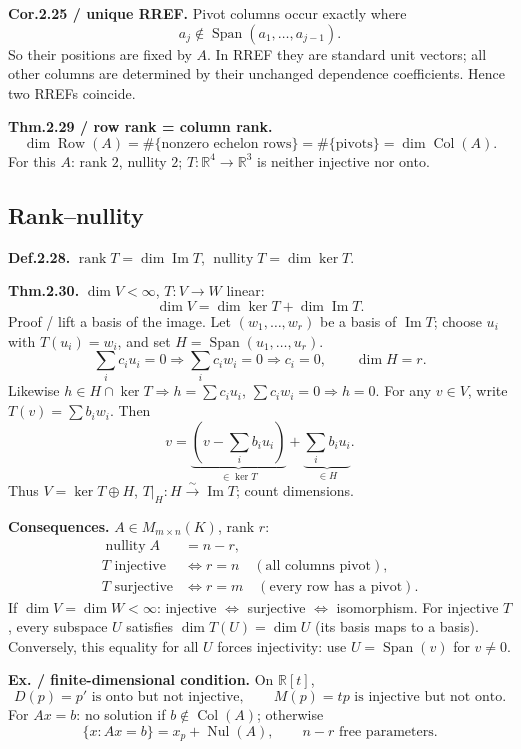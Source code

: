\documentclass[11pt,letterpaper]{article}
\begin{document}
\textbf{Cor.2.25 / unique RREF.} Pivot columns occur exactly where \[
a_j\notin\operatorname{Span}(a_1,\ldots,a_{j-1}).
\] So their positions are fixed by \(A\). In RREF they are standard unit
vectors; all other columns are determined by their unchanged dependence
coefficients. Hence two RREFs coincide.

\textbf{Thm.2.29 / row rank = column rank.} \[
\dim\operatorname{Row}(A)
=\#\{\text{nonzero echelon rows}\}
=\#\{\text{pivots}\}
=\dim\operatorname{Col}(A).
\] For this \(A\): rank \(2\), nullity \(2\);
\(T:\mathbb R^4\to\mathbb R^3\) is neither injective nor onto.

\newpage

\subsection{Rank--nullity}\label{ranknullity}

\textbf{Def.2.28.} \(\operatorname{rank}T=\dim\operatorname{Im}T\),
\(\operatorname{nullity}T=\dim\ker T\).

\textbf{Thm.2.30.} \(\dim V<\infty\), \(T:V\to W\) linear: \[
\boxed{\dim V=\dim\ker T+\dim\operatorname{Im}T.}
\] Proof / lift a basis of the image. Let \((w_1,\ldots,w_r)\) be a
basis of \(\operatorname{Im}T\); choose \(u_i\) with \(T(u_i)=w_i\), and
set \(H=\operatorname{Span}(u_1,\ldots,u_r)\). \[
\sum_i c_iu_i=0\Rightarrow\sum_i c_iw_i=0\Rightarrow c_i=0,
\qquad \dim H=r.
\] Likewise \(h\in H\cap\ker T\Rightarrow h=\sum c_iu_i\),
\(\sum c_iw_i=0\Rightarrow h=0\). For any \(v\in V\), write
\(T(v)=\sum b_iw_i\). Then \[
v=\underbrace{\left(v-\sum_i b_iu_i\right)}_{\in\ker T}
+\underbrace{\sum_i b_iu_i}_{\in H}.
\] Thus \(V=\ker T\oplus H\),
\(T|_H:H\xrightarrow{\sim}\operatorname{Im}T\); count dimensions.

\textbf{Consequences.} \(A\in M_{m\times n}(K)\), rank \(r\): \[
\begin{aligned}
\operatorname{nullity}A&=n-r,\\
T\text{ injective}&\iff r=n\quad(\text{all columns pivot}),\\
T\text{ surjective}&\iff r=m\quad(\text{every row has a pivot}).
\end{aligned}
\] If \(\dim V=\dim W<\infty\): injective \(\iff\) surjective \(\iff\)
isomorphism. For injective \(T\), every subspace \(U\) satisfies
\(\dim T(U)=\dim U\) (its basis maps to a basis). Conversely, this
equality for all \(U\) forces injectivity: use
\(U=\operatorname{Span}(v)\) for \(v\ne0\).

\textbf{Ex. / finite-dimensional condition.} On \(\mathbb R[t]\), \[
D(p)=p'\text{ is onto but not injective},\qquad
M(p)=tp\text{ is injective but not onto}.
\] For \(Ax=b\): no solution if \(b\notin\operatorname{Col}(A)\);
otherwise \[
\{x:Ax=b\}=x_p+\operatorname{Nul}(A),\qquad n-r\text{ free parameters}.
\]
\end{document}

